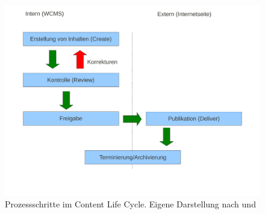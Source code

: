 \begin{figure}[!ht]
\begin{center}
\includegraphics[scale=0.5]{images/grundlagen/lifecycle.pdf}
\caption[Prozessschritte im Content Life Cycle]{Prozessschritte im Content Life Cycle. Eigene Darstellung nach \citep[S. 81]{rockley} und \citep[S. 10]{RitterSwot}}
\label{rackmiddlewares}
\end{center}
\end{figure}



